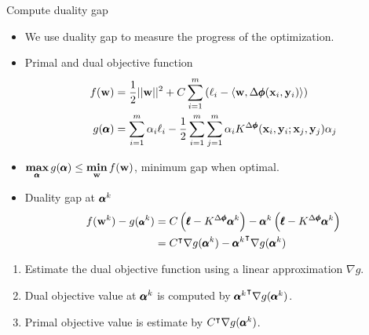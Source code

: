 \documentclass[first=dgreen,second=purple,logo=yellowexc]{aaltoslides}
\begin{document}
\begin{frame}{Compute duality gap}
	\begin{itemize}\footnotesize
		\item We use duality gap to measure the progress of the optimization.
		\item Primal and dual objective function
		\begin{align*}\footnotesize
			f(\mathbf {w}) &= \frac{1}{2}||\mathbf {w}||^2 + C\sum_{i=1}^m\left(\ell_i-\langle \mathbf {w}, \Delta\pmb \phi(\mathbf {x}_i,\mathbf {y}_i) \rangle\right)\\
			g(\pmb {\alpha}) &= \sum_{i=1}^m\alpha_i\ell_i - \frac{1}{2}\sum_{i=1}^m\sum_{j=1}^m\alpha_iK^{\Delta\pmb \phi}(\mathbf {x}_i,\mathbf {y}_i;\mathbf {x}_j,\mathbf {y}_j)\alpha_j
		\end{align*}
		\item $\underset{\pmb {\alpha}}{\textbf{max}}\,g(\pmb {\alpha})\le \underset{\mathbf {w}}{\textbf{min}}\,f(\mathbf {w})$, minimum gap when optimal.
		\item Duality gap at $\pmb {\alpha}^k$
		\begin{align*}\footnotesize
			f(\mathbf {w}^k) - g(\pmb {\alpha}^k) &= C\left(\pmb {\ell}-K^{\Delta\pmb \phi}\pmb {\alpha}^k\right) - \pmb {\alpha}^k\left(\pmb {\ell}-K^{\Delta\pmb \phi}\pmb {\alpha}^k\right)\\
			&= C^{\intercal} \nabla g(\pmb {\alpha}^k) -{\pmb {\alpha}^k} ^{\intercal} \nabla g(\pmb {\alpha}^k)
		\end{align*}
	\end{itemize}
		\begin{enumerate}\footnotesize
			\item Estimate the dual objective function using a linear approximation $\nabla g$.
			\item Dual objective value at $\pmb {\alpha}^k$ is computed by ${\pmb {\alpha}^k} ^{\intercal} \nabla g(\pmb {\alpha}^k)$.
			\item Primal objective value is estimate by $C^{\intercal} \nabla g(\pmb {\alpha}^k)$.
		\end{enumerate}
\end{frame}
\end{document}
